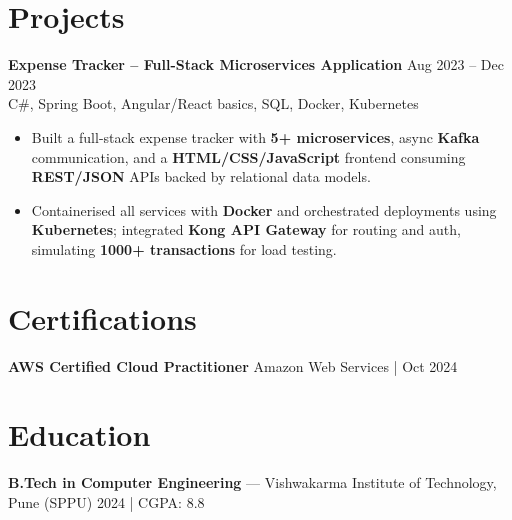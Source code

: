 \documentclass[10pt,letterpaper]{article}
\newcommand{\resumeSubheading}[4]{%
  \textbf{#1} \hfill #2 \\
  #3 \hfill #4 \\
}
\begin{document}
\section*{Projects}

\resumeSubheading{Expense Tracker -- Full-Stack Microservices Application}{Aug 2023 -- Dec 2023}{}{C\#, Spring Boot, Angular/React basics, SQL, Docker, Kubernetes}
\begin{itemize}
    \item Built a full-stack expense tracker with \textbf{5+ microservices}, async \textbf{Kafka} communication, and a \textbf{HTML/CSS/JavaScript} frontend consuming \textbf{REST/JSON} APIs backed by relational data models.
    \item Containerised all services with \textbf{Docker} and orchestrated deployments using \textbf{Kubernetes}; integrated \textbf{Kong API Gateway} for routing and auth, simulating \textbf{1000+ transactions} for load testing.
\end{itemize}

\section*{Certifications}
\textbf{AWS Certified Cloud Practitioner} \hfill Amazon Web Services \;|\; Oct 2024

\section*{Education}
\textbf{B.Tech in Computer Engineering} --- Vishwakarma Institute of Technology, Pune (SPPU) \hfill 2024 \;|\; CGPA: 8.8
\end{document}
